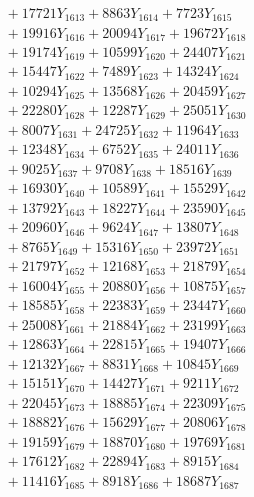 \documentclass[a4paper,10pt]{article}
\begin{document}
{\begin{align}
&\;  + 17721 Y_{1613} + 8863 Y_{1614} + 7723 Y_{1615} \\[0.3ex]
&\;  + 19916 Y_{1616} + 20094 Y_{1617} + 19672 Y_{1618} \\[0.5ex]\allowbreak
&\;  + 19174 Y_{1619} + 10599 Y_{1620} + 24407 Y_{1621} \\[0.3ex]
&\;  + 15447 Y_{1622} + 7489 Y_{1623} + 14324 Y_{1624} \\[0.3ex]
&\;  + 10294 Y_{1625} + 13568 Y_{1626} + 20459 Y_{1627} \\[0.3ex]
&\;  + 22280 Y_{1628} + 12287 Y_{1629} + 25051 Y_{1630} \\[0.3ex]
&\;  + 8007 Y_{1631} + 24725 Y_{1632} + 11964 Y_{1633} \\[0.3ex]
&\;  + 12348 Y_{1634} + 6752 Y_{1635} + 24011 Y_{1636} \\[0.3ex]
&\;  + 9025 Y_{1637} + 9708 Y_{1638} + 18516 Y_{1639} \\[0.3ex]
&\;  + 16930 Y_{1640} + 10589 Y_{1641} + 15529 Y_{1642} \\[0.3ex]
&\;  + 13792 Y_{1643} + 18227 Y_{1644} + 23590 Y_{1645} \\[0.3ex]
&\;  + 20960 Y_{1646} + 9624 Y_{1647} + 13807 Y_{1648} \\[0.5ex]\allowbreak
&\;  + 8765 Y_{1649} + 15316 Y_{1650} + 23972 Y_{1651} \\[0.3ex]
&\;  + 21797 Y_{1652} + 12168 Y_{1653} + 21879 Y_{1654} \\[0.3ex]
&\;  + 16004 Y_{1655} + 20880 Y_{1656} + 10875 Y_{1657} \\[0.3ex]
&\;  + 18585 Y_{1658} + 22383 Y_{1659} + 23447 Y_{1660} \\[0.3ex]
&\;  + 25008 Y_{1661} + 21884 Y_{1662} + 23199 Y_{1663} \\[0.3ex]
&\;  + 12863 Y_{1664} + 22815 Y_{1665} + 19407 Y_{1666} \\[0.3ex]
&\;  + 12132 Y_{1667} + 8831 Y_{1668} + 10845 Y_{1669} \\[0.3ex]
&\;  + 15151 Y_{1670} + 14427 Y_{1671} + 9211 Y_{1672} \\[0.3ex]
&\;  + 22045 Y_{1673} + 18885 Y_{1674} + 22309 Y_{1675} \\[0.3ex]
&\;  + 18882 Y_{1676} + 15629 Y_{1677} + 20806 Y_{1678} \\[0.5ex]\allowbreak
&\;  + 19159 Y_{1679} + 18870 Y_{1680} + 19769 Y_{1681} \\[0.3ex]
&\;  + 17612 Y_{1682} + 22894 Y_{1683} + 8915 Y_{1684} \\[0.3ex]
&\;  + 11416 Y_{1685} + 8918 Y_{1686} + 18687 Y_{1687} \\[0.3ex]

\end{align}}
\end{document}
